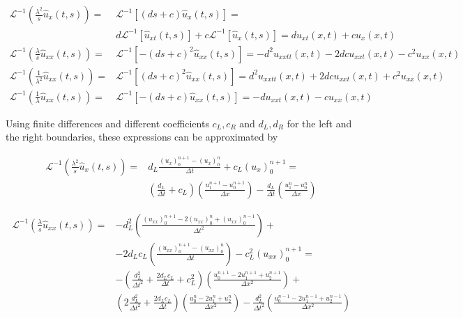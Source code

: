 \begin{equation}
	\begin{split}
    \mathcal{L}^{-1} \left( \frac{\lambda^2}{s} \hat{u}_x(t,s) \right) = & \mathcal{L}^{-1} \left[ (ds+c) \hat{u}_x(t,s) \right] = \\
    			 & d\mathcal{L}^{-1} \left[ \hat{u}_{xt}(t,s) \right] + c \mathcal{L}^{-1} \left[ \hat{u}_{x}(t,s) \right] =   du_{xt}(x,t) + cu_x(x,t) \\
    \mathcal{L}^{-1} \left( \frac{\lambda}{s} \hat{u}_{xx}(t,s) \right) = & \mathcal{L}^{-1} \left[ -(ds+c)^2 \hat{u}_{xx}(t,s) \right] =  -d^2u_{xxtt}(x,t) -2dcu_{xxt}(x,t) - c^2u_{xx}(x,t) \\
    \mathcal{L}^{-1} \left( \frac{1}{\lambda^2} \hat{u}_{xx}(t,s) \right) = & \mathcal{L}^{-1} \left[ (ds+c)^2 \hat{u}_{xx}(t,s) \right] =d^2u_{xxtt}(x,t) + 2dcu_{xxt}(x,t) + c^2u_{xx}(x,t) \\
    \mathcal{L}^{-1} \left( \frac{1}{\lambda} \hat{u}_{xx}(t,s) \right) = & \mathcal{L}^{-1} \left[ -(ds+c) \hat{u}_{xx}(t,s) \right] = -du_{xxt}(x,t) - cu_{xx}(x,t)
    \end{split}
\end{equation}

\indent Using finite differences and different coefficients $c_L,c_R$ and $d_L,d_R$ for the left and the right boundaries, these expressions can be approximated by

\begin{equation}
    \label{eq:FDorder2A}
    \begin{split}
    \mathcal{L}^{-1} \left( \frac{\lambda^2}{s} \hat{u}_x(t,s) \right) = & d_L \frac{ (u_x)_0^{n+1} - (u_x)_0^n}{\Delta t} + c_L (u_x)_0^{n+1} = \\
    			& \left( \frac{d_L}{\Delta t} + c_L \right) \left( \frac{u_1^{n+1} - u_0^{n+1}}{\Delta x}\right) - \frac{d_L}{\Delta t} \left( \frac{u_1^{n} - u_0^{n}}{\Delta x}\right)
    \end{split}
 \end{equation}
 
 \begin{equation}
     \label{eq:FDorder2B}
    \begin{split}
    \mathcal{L}^{-1} \left( \frac{\lambda}{s} \hat{u}_{xx}(t,s) \right) = & -d_L^2 \left( \frac{(u_{xx})_0^{n+1} - 2(u_{xx})_0^{n} + (u_{xx})_0^{n-1}}{\Delta t^2} \right) + \\
    			&  - 2d_Lc_L \left( \frac{(u_{xx})_0^{n+1} - (u_{xx})_0^{n}}{\Delta t} \right) - c_L^2 (u_{xx})_0^{n+1} = \\
    			& -\left( \frac{d_L^2}{\Delta t^2} + \frac{2d_Lc_L}{\Delta t} + c_L^2  \right) \left(  \frac{u_0^{n+1} - 2u_1^{n+1} + u_2^{n+1}}{\Delta x^2} \right) + \\
    			& \left( 2\frac{d_L^2}{\Delta t^2} + \frac{2d_Lc_L}{\Delta t}\right) \left(  \frac{u_0^{n} - 2u_1^n + u_2^{n}}{\Delta x^2} \right) - \frac{d_L^2}{\Delta t^2} \left(  \frac{u_0^{n-1} - 2u_1^{n-1} + u_2^{n-1}}{\Delta x^2} \right)
    \end{split}
 \end{equation}
     			
